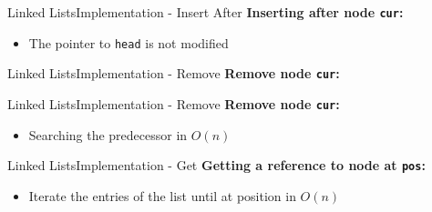 
\begin{frame}[fragile]{Linked Lists}{Implementation - Insert After}
  \textbf{Inserting after node \texttt{cur}:}
  \begin{itemize}
    \item
      The pointer to \texttt{head} is not modified
  \end{itemize}
  
\end{frame}


\begin{frame}{Linked Lists}{Implementation - Remove}
  \textbf{Remove node \texttt{cur}:}
  \begin{flushleft}
    
  \end{flushleft}
\end{frame}



\begin{frame}[fragile]{Linked Lists}{Implementation - Remove}
  \textbf{Remove node \texttt{cur}:}
  \begin{itemize}
    \item
      Searching the predecessor in $O(n)$
  \end{itemize}
  
\end{frame}


\begin{frame}[fragile]{Linked Lists}{Implementation - Get}
  \textbf{Getting a reference to node at \texttt{pos}:}
  \begin{itemize}
    \item
      Iterate the entries of the list until at position in $O(n)$
  \end{itemize}
  
\end{frame}

